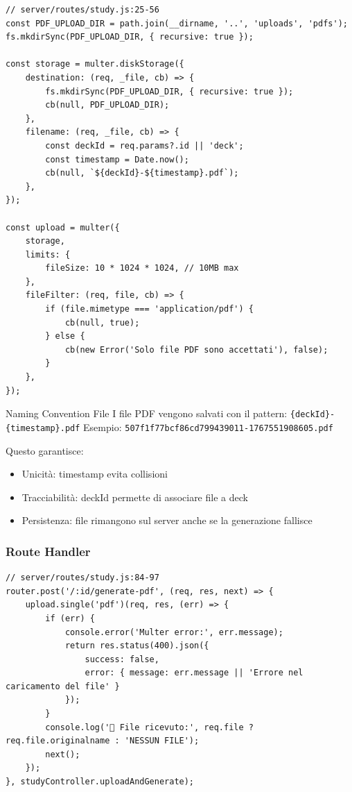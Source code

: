 \documentclass[11pt,a4paper]{article}
\begin{document}
\begin{lstlisting}[caption=Configurazione Multer per PDF Upload]
// server/routes/study.js:25-56
const PDF_UPLOAD_DIR = path.join(__dirname, '..', 'uploads', 'pdfs');
fs.mkdirSync(PDF_UPLOAD_DIR, { recursive: true });

const storage = multer.diskStorage({
    destination: (req, _file, cb) => {
        fs.mkdirSync(PDF_UPLOAD_DIR, { recursive: true });
        cb(null, PDF_UPLOAD_DIR);
    },
    filename: (req, _file, cb) => {
        const deckId = req.params?.id || 'deck';
        const timestamp = Date.now();
        cb(null, `${deckId}-${timestamp}.pdf`);
    },
});

const upload = multer({
    storage,
    limits: {
        fileSize: 10 * 1024 * 1024, // 10MB max
    },
    fileFilter: (req, file, cb) => {
        if (file.mimetype === 'application/pdf') {
            cb(null, true);
        } else {
            cb(new Error('Solo file PDF sono accettati'), false);
        }
    },
});
\end{lstlisting}

\begin{tipbox}{Naming Convention File}
I file PDF vengono salvati con il pattern: \texttt{\{deckId\}-\{timestamp\}.pdf}
Esempio: \texttt{507f1f77bcf86cd799439011-1767551908605.pdf}

Questo garantisce:
\begin{itemize}
    \item Unicità: timestamp evita collisioni
    \item Tracciabilità: deckId permette di associare file a deck
    \item Persistenza: file rimangono sul server anche se la generazione fallisce
\end{itemize}
\end{tipbox}

\subsubsection{Route Handler}

\begin{lstlisting}[caption=Route Handler con Multer Middleware]
// server/routes/study.js:84-97
router.post('/:id/generate-pdf', (req, res, next) => {
    upload.single('pdf')(req, res, (err) => {
        if (err) {
            console.error('Multer error:', err.message);
            return res.status(400).json({
                success: false,
                error: { message: err.message || 'Errore nel caricamento del file' }
            });
        }
        console.log('📄 File ricevuto:', req.file ? req.file.originalname : 'NESSUN FILE');
        next();
    });
}, studyController.uploadAndGenerate);
\end{lstlisting}
\end{document}
